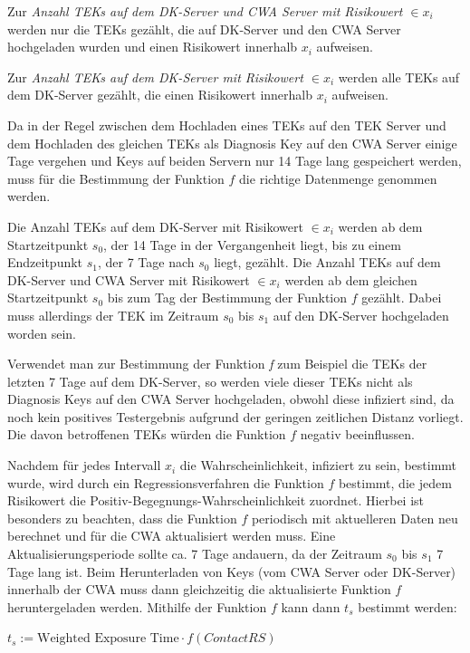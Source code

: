 \documentclass[conference,compsoc]{IEEEtran}
\begin{document}
Zur \textit{Anzahl TEKs auf dem DK-Server und CWA Server mit Risikowert $\in x_i$} werden nur die TEKs gezählt, 
die auf DK-Server und den CWA Server hochgeladen wurden und einen Risikowert innerhalb $x_i$ aufweisen. 

Zur \textit{Anzahl TEKs auf dem DK-Server mit Risikowert $\in x_i$} werden alle TEKs auf dem DK-Server gezählt, die einen Risikowert innerhalb $x_i$ aufweisen.

Da in der Regel zwischen dem Hochladen eines TEKs auf den TEK Server und dem Hochladen des gleichen TEKs als Diagnosis Key auf den CWA Server einige Tage vergehen und 
Keys auf beiden Servern nur 14 Tage lang gespeichert werden, muss für die Bestimmung der Funktion $f$ die richtige Datenmenge genommen werden.

Die Anzahl TEKs auf dem DK-Server mit Risikowert $\in x_i$ werden ab dem Startzeitpunkt $s_0$, der 14 Tage in der Vergangenheit liegt, bis zu einem Endzeitpunkt $s_1$, 
der 7 Tage nach $s_0$ liegt, gezählt. 
Die Anzahl TEKs auf dem DK-Server und CWA Server mit Risikowert $\in x_i$ werden ab dem gleichen Startzeitpunkt $s_0$ bis zum Tag der Bestimmung der Funktion $f$ gezählt.
Dabei muss allerdings der TEK im Zeitraum $s_0$ bis $s_1$ auf den DK-Server hochgeladen worden sein. 

Verwendet man zur Bestimmung der Funktion \textit{f} zum Beispiel die TEKs der letzten 7 Tage auf dem DK-Server, 
so werden viele dieser TEKs nicht als Diagnosis Keys auf den CWA Server hochgeladen, 
obwohl diese infiziert sind, da noch kein positives Testergebnis aufgrund der geringen zeitlichen Distanz vorliegt. 
Die davon betroffenen TEKs würden die Funktion $f$ negativ beeinflussen.

Nachdem für jedes Intervall $x_i$ die Wahrscheinlichkeit, infiziert zu sein, bestimmt wurde, wird durch ein Regressionsverfahren die Funktion $f$ bestimmt, 
die jedem Risikowert die Positiv-Begegnungs-Wahrscheinlichkeit zuordnet. 
Hierbei ist besonders zu beachten, dass die Funktion $f$ periodisch mit aktuelleren Daten neu berechnet und für die CWA aktualisiert werden muss. 
Eine Aktualisierungsperiode sollte ca. 7 Tage andauern, da der Zeitraum $s_0$ bis $s_1$ 7 Tage lang ist.
Beim Herunterladen von Keys (vom CWA Server oder DK-Server) innerhalb der CWA muss dann gleichzeitig die aktualisierte Funktion $f$ heruntergeladen werden. 
Mithilfe der Funktion $f$ kann dann $t_s$ bestimmt werden: 

\centerline{\text{ }}
\centerline{$t_s := \text{Weighted Exposure Time} \cdot f(ContactRS)$}
\centerline{\text{ }}
\end{document}
